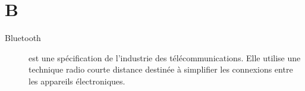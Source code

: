 \section{B}

\begin{description}
\item[Bluetooth] est une spécification de l'industrie des télécommunications. 
Elle utilise une technique radio courte distance destinée à simplifier les 
connexions entre les appareils électroniques.
\end{description}
